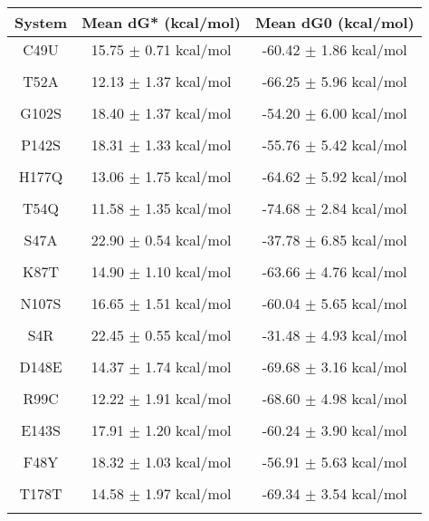 \documentclass{article}
\begin{document}
\begin{table}[ht]
    \centering
    \begin{tabular}{|c|c|c|}
    \hline
    System & Mean dG* (kcal/mol) & Mean dG0 (kcal/mol) \\
    \hline
    C49U & 15.75 $\pm$ 0.71 kcal/mol & -60.42 $\pm$ 1.86 kcal/mol \\ \\
    \hline
    T52A & 12.13 $\pm$ 1.37 kcal/mol & -66.25 $\pm$ 5.96 kcal/mol \\ \\
    \hline
    G102S & 18.40 $\pm$ 1.37 kcal/mol & -54.20 $\pm$ 6.00 kcal/mol \\ \\
    \hline
    P142S & 18.31 $\pm$ 1.33 kcal/mol & -55.76 $\pm$ 5.42 kcal/mol \\ \\
    \hline
    H177Q & 13.06 $\pm$ 1.75 kcal/mol & -64.62 $\pm$ 5.92 kcal/mol \\ \\
    \hline
    T54Q & 11.58 $\pm$ 1.35 kcal/mol & -74.68 $\pm$ 2.84 kcal/mol \\ \\
    \hline
    S47A & 22.90 $\pm$ 0.54 kcal/mol & -37.78 $\pm$ 6.85 kcal/mol \\ \\
    \hline
    K87T & 14.90 $\pm$ 1.10 kcal/mol & -63.66 $\pm$ 4.76 kcal/mol \\ \\
    \hline
    N107S & 16.65 $\pm$ 1.51 kcal/mol & -60.04 $\pm$ 5.65 kcal/mol \\ \\
    \hline
    S4R & 22.45 $\pm$ 0.55 kcal/mol & -31.48 $\pm$ 4.93 kcal/mol \\ \\
    \hline
    D148E & 14.37 $\pm$ 1.74 kcal/mol & -69.68 $\pm$ 3.16 kcal/mol \\ \\
    \hline
    R99C & 12.22 $\pm$ 1.91 kcal/mol & -68.60 $\pm$ 4.98 kcal/mol \\ \\
    \hline
    E143S & 17.91 $\pm$ 1.20 kcal/mol & -60.24 $\pm$ 3.90 kcal/mol \\ \\
    \hline
    F48Y & 18.32 $\pm$ 1.03 kcal/mol & -56.91 $\pm$ 5.63 kcal/mol \\ \\
    \hline
    T178T & 14.58 $\pm$ 1.97 kcal/mol & -69.34 $\pm$ 3.54 kcal/mol \\ \\

\end{tabular}
\end{table}
\end{document}
